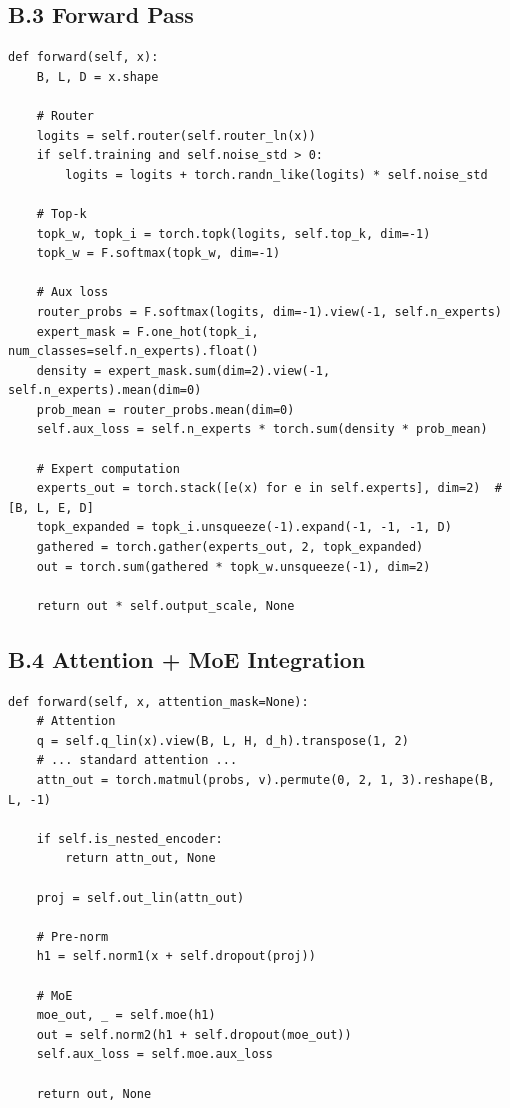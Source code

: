 \subsection{B.3 Forward Pass}

\begin{lstlisting}
def forward(self, x):
    B, L, D = x.shape
    
    # Router
    logits = self.router(self.router_ln(x))
    if self.training and self.noise_std > 0:
        logits = logits + torch.randn_like(logits) * self.noise_std
    
    # Top-k
    topk_w, topk_i = torch.topk(logits, self.top_k, dim=-1)
    topk_w = F.softmax(topk_w, dim=-1)
    
    # Aux loss
    router_probs = F.softmax(logits, dim=-1).view(-1, self.n_experts)
    expert_mask = F.one_hot(topk_i, num_classes=self.n_experts).float()
    density = expert_mask.sum(dim=2).view(-1, self.n_experts).mean(dim=0)
    prob_mean = router_probs.mean(dim=0)
    self.aux_loss = self.n_experts * torch.sum(density * prob_mean)
    
    # Expert computation
    experts_out = torch.stack([e(x) for e in self.experts], dim=2)  # [B, L, E, D]
    topk_expanded = topk_i.unsqueeze(-1).expand(-1, -1, -1, D)
    gathered = torch.gather(experts_out, 2, topk_expanded)
    out = torch.sum(gathered * topk_w.unsqueeze(-1), dim=2)
    
    return out * self.output_scale, None
\end{lstlisting}

\subsection{B.4 Attention + MoE Integration}

\begin{lstlisting}
def forward(self, x, attention_mask=None):
    # Attention
    q = self.q_lin(x).view(B, L, H, d_h).transpose(1, 2)
    # ... standard attention ...
    attn_out = torch.matmul(probs, v).permute(0, 2, 1, 3).reshape(B, L, -1)
    
    if self.is_nested_encoder:
        return attn_out, None
    
    proj = self.out_lin(attn_out)
    
    # Pre-norm
    h1 = self.norm1(x + self.dropout(proj))
    
    # MoE
    moe_out, _ = self.moe(h1)
    out = self.norm2(h1 + self.dropout(moe_out))
    self.aux_loss = self.moe.aux_loss
    
    return out, None
\end{lstlisting}

